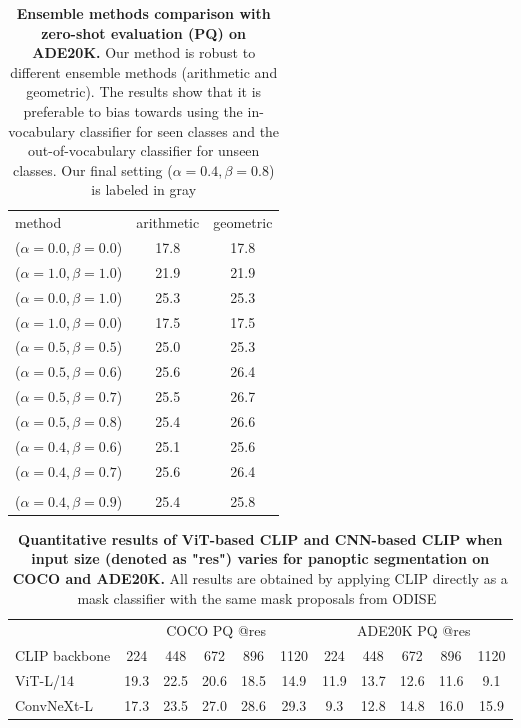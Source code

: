 \documentclass{article}
\newcommand{\baseline}[1]{\cellcolor{baselinecolor}{#1}}
\newcommand{\tablestyle}[2]{\setlength{\tabcolsep}{#1}\renewcommand{\arraystretch}{#2}\centering\footnotesize}
\begin{document}
\begin{table}[!t]
\tablestyle{6pt}{1.1}
\caption{
\textbf{Ensemble methods comparison with zero-shot evaluation (PQ) on ADE20K.}
Our method is robust to different ensemble methods (arithmetic and geometric).
The results show that it is preferable to bias towards using the in-vocabulary classifier for seen classes and the out-of-vocabulary classifier for unseen classes. Our final setting ($\alpha=0.4, \beta=0.8$) is labeled in gray
}
\label{tab:ensemble_ablate}
\begin{tabular}{l|cc}
   method                    & arithmetic             & geometric            \\
   \shline
   ($\alpha=0.0,\beta=0.0$) & 17.8 & 17.8   \\
   ($\alpha=1.0,\beta=1.0$) & 21.9 & 21.9   \\
   ($\alpha=0.0,\beta=1.0$) & 25.3 & 25.3   \\
   ($\alpha=1.0,\beta=0.0$) & 17.5 & 17.5   \\
   ($\alpha=0.5,\beta=0.5$) & 25.0 & 25.3   \\
   ($\alpha=0.5,\beta=0.6$) & 25.6 & 26.4   \\
   ($\alpha=0.5,\beta=0.7$) & 25.5 & 26.7   \\
   ($\alpha=0.5,\beta=0.8$) & 25.4 & 26.6  \\
   ($\alpha=0.4,\beta=0.6$) & 25.1 & 25.6   \\
   ($\alpha=0.4,\beta=0.7$) & 25.6 & 26.4   \\
   \baseline{($\alpha=0.4,\beta=0.8$)} & \baseline{25.6} & \baseline{26.8}   \\
   ($\alpha=0.4,\beta=0.9$) & 25.4 & 25.8   \\
   
\end{tabular}
\end{table}

\begin{table}[!t]
\tablestyle{2pt}{1.1}
\caption{
\textbf{Quantitative results of ViT-based CLIP and CNN-based CLIP when input size (denoted as "res") varies for panoptic segmentation on COCO and ADE20K.} All results are obtained by applying CLIP directly as a mask classifier with the same mask proposals from ODISE~\cite{xu2023open}
}
\label{tab:vit_vs_cnn_clip}
\begin{tabular}{l|ccccc|ccccc}
                              & \multicolumn{5}{c|}{COCO PQ @res}                & \multicolumn{5}{c}{ADE20K PQ @res}          \\
   CLIP backbone                    & 224            & 448            & 672   & 896 &  1120      & 224            & 448            & 672    & 896 & 1120        \\
   \shline
   ViT-L/14 & 19.3 & 22.5 & 20.6  & 18.5 & 14.9 & 11.9 & 13.7 & 12.6 & 11.6 & 9.1 \\ ConvNeXt-L  & 17.3 & 23.5 & 27.0 & 28.6 & 29.3 & 9.3 & 12.8 & 14.8 & 16.0 & 15.9
\end{tabular}
\end{table}
\end{document}
